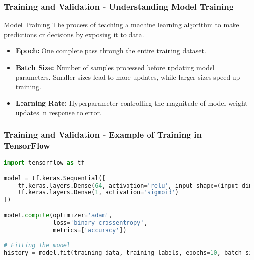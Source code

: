 \documentclass[aspectratio=169]{beamer}
\begin{document}
\begin{frame}[fragile]
    \frametitle{Training and Validation - Understanding Model Training}
    \begin{block}{Model Training}
        The process of teaching a machine learning algorithm to make predictions or decisions by exposing it to data.
    \end{block}
    
    \begin{itemize}
        \item \textbf{Epoch:} One complete pass through the entire training dataset.
        \item \textbf{Batch Size:} Number of samples processed before updating model parameters. Smaller sizes lead to more updates, while larger sizes speed up training.
        \item \textbf{Learning Rate:} Hyperparameter controlling the magnitude of model weight updates in response to error.
    \end{itemize}
    
\end{frame}

\begin{frame}[fragile]
    \frametitle{Training and Validation - Example of Training in TensorFlow}
    \begin{lstlisting}[language=Python]
import tensorflow as tf

model = tf.keras.Sequential([
    tf.keras.layers.Dense(64, activation='relu', input_shape=(input_dim,)),
    tf.keras.layers.Dense(1, activation='sigmoid')
])

model.compile(optimizer='adam',
              loss='binary_crossentropy',
              metrics=['accuracy'])

# Fitting the model
history = model.fit(training_data, training_labels, epochs=10, batch_size=32)
    \end{lstlisting}
\end{frame}
\end{document}
